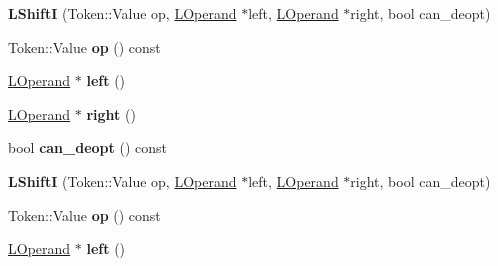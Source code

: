 \begin{DoxyCompactItemize}
\item 
{\bfseries L\+ShiftI} (Token\+::\+Value op, \hyperlink{classv8_1_1internal_1_1_l_operand}{L\+Operand} $\ast$left, \hyperlink{classv8_1_1internal_1_1_l_operand}{L\+Operand} $\ast$right, bool can\+\_\+deopt)\hypertarget{classv8_1_1internal_1_1_l_shift_i_adaac229c54d2a924ac68d595fc30703a}{}\label{classv8_1_1internal_1_1_l_shift_i_adaac229c54d2a924ac68d595fc30703a}

\item 
Token\+::\+Value {\bfseries op} () const \hypertarget{classv8_1_1internal_1_1_l_shift_i_af3e3cecd04a31cf7df5a66653f6c009d}{}\label{classv8_1_1internal_1_1_l_shift_i_af3e3cecd04a31cf7df5a66653f6c009d}

\item 
\hyperlink{classv8_1_1internal_1_1_l_operand}{L\+Operand} $\ast$ {\bfseries left} ()\hypertarget{classv8_1_1internal_1_1_l_shift_i_a5ef728d134ab0ae5565b90793364add0}{}\label{classv8_1_1internal_1_1_l_shift_i_a5ef728d134ab0ae5565b90793364add0}

\item 
\hyperlink{classv8_1_1internal_1_1_l_operand}{L\+Operand} $\ast$ {\bfseries right} ()\hypertarget{classv8_1_1internal_1_1_l_shift_i_a728880e17b20375b612e631dcc13dc3e}{}\label{classv8_1_1internal_1_1_l_shift_i_a728880e17b20375b612e631dcc13dc3e}

\item 
bool {\bfseries can\+\_\+deopt} () const \hypertarget{classv8_1_1internal_1_1_l_shift_i_abbbf228b7c1516e1e419ef9ffbcc97b6}{}\label{classv8_1_1internal_1_1_l_shift_i_abbbf228b7c1516e1e419ef9ffbcc97b6}

\item 
{\bfseries L\+ShiftI} (Token\+::\+Value op, \hyperlink{classv8_1_1internal_1_1_l_operand}{L\+Operand} $\ast$left, \hyperlink{classv8_1_1internal_1_1_l_operand}{L\+Operand} $\ast$right, bool can\+\_\+deopt)\hypertarget{classv8_1_1internal_1_1_l_shift_i_adaac229c54d2a924ac68d595fc30703a}{}\label{classv8_1_1internal_1_1_l_shift_i_adaac229c54d2a924ac68d595fc30703a}

\item 
Token\+::\+Value {\bfseries op} () const \hypertarget{classv8_1_1internal_1_1_l_shift_i_af3e3cecd04a31cf7df5a66653f6c009d}{}\label{classv8_1_1internal_1_1_l_shift_i_af3e3cecd04a31cf7df5a66653f6c009d}

\item 
\hyperlink{classv8_1_1internal_1_1_l_operand}{L\+Operand} $\ast$ {\bfseries left} ()\hypertarget{classv8_1_1internal_1_1_l_shift_i_a5ef728d134ab0ae5565b90793364add0}{}\label{classv8_1_1internal_1_1_l_shift_i_a5ef728d134ab0ae5565b90793364add0}


\end{DoxyCompactItemize}
